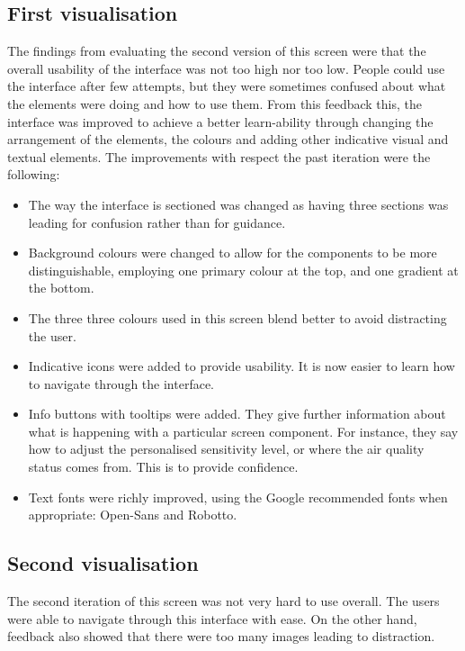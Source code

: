 \subsection{First visualisation}
The findings from evaluating the second version of this screen were that the overall usability of the interface was not too high nor too low. People could use the interface after few attempts, but they were sometimes confused about what the elements were doing and how to use them. From this feedback this, the interface was improved to achieve a better learn-ability through changing the arrangement of the elements, the colours and adding other indicative visual and textual elements.
The improvements with respect the past iteration were the following:
\begin{itemize}
    \item  The way the interface is sectioned was changed as having three sections was leading for confusion rather than for guidance.
    \item Background colours were changed to allow for the components to be more distinguishable, employing one primary colour at the top, and one gradient at the bottom.
    \item  The three three colours used in this screen blend better to avoid distracting the user.
    \item Indicative icons were added to provide usability. It is now easier to learn how to navigate through the interface.
    \item Info buttons with tooltips were added. They give further information about what is happening with a particular screen component. For instance, they say how to adjust the personalised sensitivity level, or where the air quality status comes from. This is to provide confidence. 
    \item Text fonts were richly improved, using the Google recommended fonts when appropriate:  Open-Sans and Robotto.
\end{itemize}

\subsection{Second visualisation}
The second iteration of this screen was not very hard to use overall. The users were able to navigate through this interface with ease. On the other hand, feedback also showed that there were too many images leading to distraction. 

